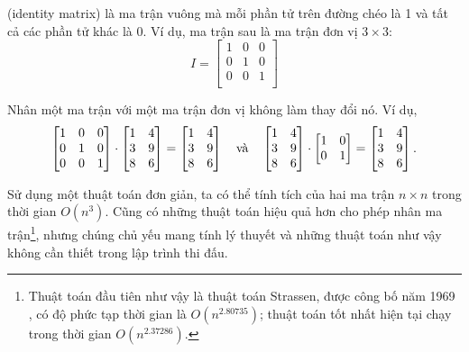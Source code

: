  (identity matrix) là ma trận vuông
mà mỗi phần tử trên đường chéo là 1
và tất cả các phần tử khác là 0.
Ví dụ, ma trận sau
là ma trận đơn vị $3 \times 3$:
\[
 I = \begin{bmatrix}
  1 & 0 & 0 \\
  0 & 1 & 0 \\
  0 & 0 & 1 \\
 \end{bmatrix}
\]

\begin{samepage}
Nhân một ma trận với một ma trận đơn vị
không làm thay đổi nó. Ví dụ,
\[
 \begin{bmatrix}
  1 & 0 & 0 \\
  0 & 1 & 0 \\
  0 & 0 & 1 \\
 \end{bmatrix}
\cdot
 \begin{bmatrix}
  1 & 4 \\
  3 & 9 \\
  8 & 6 \\
 \end{bmatrix}
=
 \begin{bmatrix}
  1 & 4 \\
  3 & 9 \\
  8 & 6 \\
 \end{bmatrix} \hspace{10px} \textrm{và} \hspace{10px}
 \begin{bmatrix}
  1 & 4 \\
  3 & 9 \\
  8 & 6 \\
 \end{bmatrix}
\cdot
 \begin{bmatrix}
  1 & 0 \\
  0 & 1 \\
 \end{bmatrix}
=
 \begin{bmatrix}
  1 & 4 \\
  3 & 9 \\
  8 & 6 \\
 \end{bmatrix}.
\]
\end{samepage}

Sử dụng một thuật toán đơn giản,
ta có thể tính tích của
hai ma trận $n \times n$
trong thời gian $O(n^3)$.
Cũng có những thuật toán hiệu quả hơn
cho phép nhân ma trận\footnote{Thuật toán đầu tiên như vậy
là thuật toán Strassen,
được công bố năm 1969 \cite{str69},
có độ phức tạp thời gian là $O(n^{2.80735})$;
thuật toán tốt nhất hiện tại \cite{gal14}
chạy trong thời gian $O(n^{2.37286})$.},
nhưng chúng chủ yếu mang tính lý thuyết
và những thuật toán như vậy không cần thiết
trong lập trình thi đấu.


